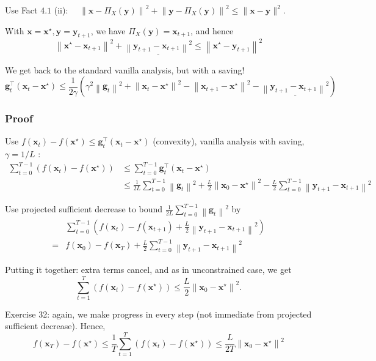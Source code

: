 Use Fact $4.1$ (ii): $\quad\left\|\mathbf{x}-\Pi_{X}(\mathbf{y})\right\|^{2}+\left\|\mathbf{y}-\Pi_{X}(\mathbf{y})\right\|^{2} \leq\|\mathbf{x}-\mathbf{y}\|^{2}$.

With $\mathbf{x}=\mathbf{x}^{\star}, \mathbf{y}=\mathbf{y}_{t+1}$, we have $\Pi_{X}(\mathbf{y})=\mathbf{x}_{t+1}$, and hence
$$
\left\|\mathbf{x}^{\star}-\mathbf{x}_{t+1}\right\|^{2}+\underline{\left\|\mathbf{y}_{t+1}-\mathbf{x}_{t+1}\right\|^{2}} \leq\left\|\mathbf{x}^{\star}-\mathbf{y}_{t+1}\right\|^{2}
$$

We get back to the standard vanilla analysis, but with a saving!
$$
\mathbf{g}_{t}^{\top}\left(\mathbf{x}_{t}-\mathbf{x}^{\star}\right) \leq \frac{1}{2 \gamma}\left(\gamma^{2}\left\|\mathbf{g}_{t}\right\|^{2}+\left\|\mathbf{x}_{t}-\mathbf{x}^{\star}\right\|^{2}-\left\|\mathbf{x}_{t+1}-\mathbf{x}^{\star}\right\|^{2}-\underline{\left\|\mathbf{y}_{t+1}-\mathbf{x}_{t+1}\right\|^{2}}\right)
$$

\subsubsection*{Proof}
Use $f\left(\mathbf{x}_{t}\right)-f\left(\mathbf{x}^{\star}\right) \leq \mathbf{g}_{t}^{\top}\left(\mathbf{x}_{t}-\mathbf{x}^{\star}\right)$ (convexity), vanilla analysis with saving, $\gamma=1 / L$ :
$$
\begin{aligned}
\sum_{t=0}^{T-1}\left(f\left(\mathbf{x}_{t}\right)-f\left(\mathbf{x}^{\star}\right)\right) & \leq \sum_{t=0}^{T-1} \mathbf{g}_{t}^{\top}\left(\mathbf{x}_{t}-\mathbf{x}^{\star}\right) \\
& \leq \frac{1}{2 L} \sum_{t=0}^{T-1}\left\|\mathbf{g}_{t}\right\|^{2}+\frac{L}{2}\left\|\mathbf{x}_{0}-\mathbf{x}^{\star}\right\|^{2}-\frac{L}{2} \sum_{t=0}^{T-1}\left\|\mathbf{y}_{t+1}-\mathbf{x}_{t+1}\right\|^{2}
\end{aligned}
$$

Use projected sufficient decrease to bound $\frac{1}{2 L} \sum_{t=0}^{T-1}\left\|\mathbf{g}_{t}\right\|^{2}$ by
$$
\begin{aligned}
&\sum_{t=0}^{T-1}\left(f\left(\mathbf{x}_{t}\right)-f\left(\mathbf{x}_{t+1}\right)+\frac{L}{2}\left\|\mathbf{y}_{t+1}-\mathbf{x}_{t+1}\right\|^{2}\right) \\
=&f\left(\mathbf{x}_{0}\right)-f\left(\mathbf{x}_{T}\right)+\frac{L}{2} \sum_{t=0}^{T-1}\left\|\mathbf{y}_{t+1}-\mathbf{x}_{t+1}\right\|^{2}
\end{aligned}
$$

Putting it together: extra terms cancel, and as in unconstrained case, we get
$$
\sum_{t=1}^{T}\left(f\left(\mathbf{x}_{t}\right)-f\left(\mathbf{x}^{\star}\right)\right) \leq \frac{L}{2}\left\|\mathbf{x}_{0}-\mathbf{x}^{\star}\right\|^{2} .
$$

Exercise 32: again, we make progress in every step (not immediate from projected sufficient decrease). Hence,
$$
f\left(\mathbf{x}_{T}\right)-f\left(\mathbf{x}^{\star}\right) \leq \frac{1}{T} \sum_{t=1}^{T}\left(f\left(\mathbf{x}_{t}\right)-f\left(\mathbf{x}^{\star}\right)\right) \leq \frac{L}{2 T}\left\|\mathbf{x}_{0}-\mathbf{x}^{\star}\right\|^{2}
$$





